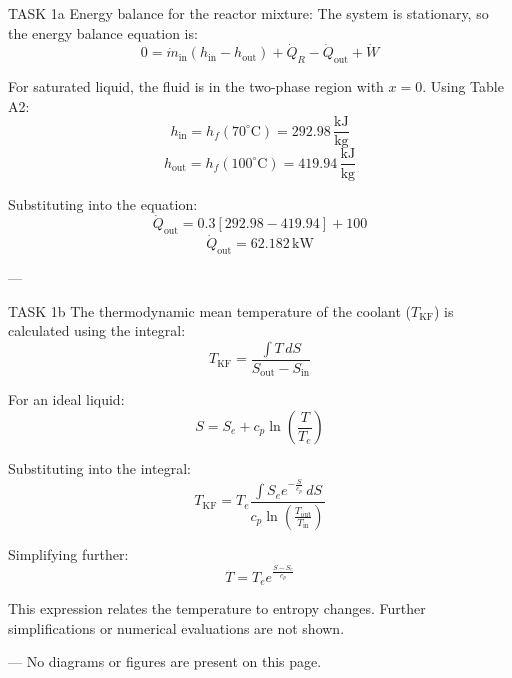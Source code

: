 TASK 1a  
Energy balance for the reactor mixture:  
The system is stationary, so the energy balance equation is:  
\[
0 = \dot{m}_{\text{in}} \left( h_{\text{in}} - h_{\text{out}} \right) + \dot{Q}_R - \dot{Q}_{\text{out}} + \dot{W}
\]  

For saturated liquid, the fluid is in the two-phase region with \( x = 0 \). Using Table A2:  
\[
h_{\text{in}} = h_f(70^\circ\text{C}) = 292.98 \, \frac{\text{kJ}}{\text{kg}}
\]  
\[
h_{\text{out}} = h_f(100^\circ\text{C}) = 419.94 \, \frac{\text{kJ}}{\text{kg}}
\]  

Substituting into the equation:  
\[
\dot{Q}_{\text{out}} = 0.3 \left[ 292.98 - 419.94 \right] + 100
\]  
\[
\dot{Q}_{\text{out}} = 62.182 \, \text{kW}
\]  

---

TASK 1b  
The thermodynamic mean temperature of the coolant (\( T_{\text{KF}} \)) is calculated using the integral:  
\[
T_{\text{KF}} = \frac{\int T \, dS}{S_{\text{out}} - S_{\text{in}}}
\]  

For an ideal liquid:  
\[
S = S_e + c_p \ln \left( \frac{T}{T_e} \right)
\]  

Substituting into the integral:  
\[
T_{\text{KF}} = T_e \frac{\int S_e e^{-\frac{S}{c_p}} \, dS}{c_p \ln \left( \frac{T_{\text{out}}}{T_{\text{in}}} \right)}
\]  

Simplifying further:  
\[
T = T_e e^{\frac{S - S_e}{c_p}}
\]  

This expression relates the temperature to entropy changes. Further simplifications or numerical evaluations are not shown.  

---  
No diagrams or figures are present on this page.
